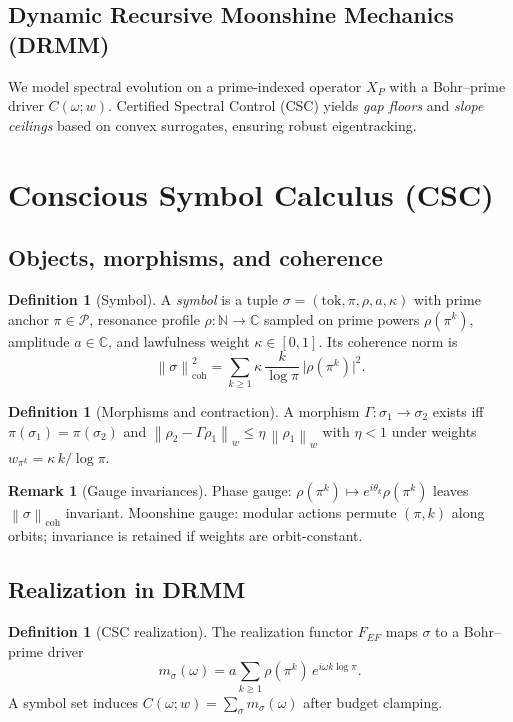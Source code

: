 \documentclass[11pt]{article}
\theoremstyle{plain}
\theoremstyle{definition}
\newtheorem{definition}[theorem]{Definition}
\newtheorem{remark}[theorem]{Remark}
\newcommand{\N}{\mathbb{N}}
\newcommand{\C}{\mathbb{C}}
\newcommand{\PP}{\mathcal{P}}
\newcommand{\norm}[1]{\left\lVert #1 \right\rVert}
\begin{document}
\subsection{Dynamic Recursive Moonshine Mechanics (DRMM)}
We model spectral evolution on a prime-indexed operator \(X_P\) with a Bohr--prime driver \(C(\omega;w)\). Certified Spectral Control (CSC) yields \emph{gap floors} and \emph{slope ceilings} based on convex surrogates, ensuring robust eigentracking.

\section{Conscious Symbol Calculus (CSC)}\label{sec:CSC}
\subsection{Objects, morphisms, and coherence}
\begin{definition}[Symbol]\label{def:symbol}
A \emph{symbol} is a tuple \(\sigma=(\mathrm{tok}, \pi, \rho, a, \kappa)\) with prime anchor \(\pi\in\PP\), resonance profile \(\rho:\N\to\C\) sampled on prime powers \(\rho(\pi^k)\), amplitude \(a\in\C\), and lawfulness weight \(\kappa\in[0,1]\). Its coherence norm is
\begin{equation}
\norm{\sigma}_{\mathrm{coh}}^2
= \sum_{k\ge 1} \kappa\,\frac{k}{\log \pi}\,\big|\rho(\pi^k)\big|^2.
\end{equation}
\end{definition}

\begin{definition}[Morphisms and contraction]
A morphism \(\Gamma: \sigma_1\to\sigma_2\) exists iff \(\pi(\sigma_1)=\pi(\sigma_2)\) and
\(\norm{\rho_2 - \Gamma\rho_1}_w \le \eta\,\norm{\rho_1}_w\) with \(\eta<1\) under weights \(w_{\pi^k}=\kappa\,k/\log\pi\).
\end{definition}

\begin{remark}[Gauge invariances]
Phase gauge: \(\rho(\pi^k)\mapsto e^{i\theta_{k}}\rho(\pi^k)\) leaves \(\norm{\sigma}_{\mathrm{coh}}\) invariant. Moonshine gauge: modular actions permute \((\pi,k)\) along orbits; invariance is retained if weights are orbit-constant.
\end{remark}

\subsection{Realization in DRMM}
\begin{definition}[CSC realization]
The realization functor \(F_{EF}\) maps \(\sigma\) to a Bohr--prime driver
\begin{equation}
 m_{\sigma}(\omega)= a\sum_{k\ge 1} \rho(\pi^k)\,e^{i\omega k \log \pi}.
\end{equation}
A symbol set induces \(C(\omega;w)=\sum_{\sigma} m_{\sigma}(\omega)\) after budget clamping.
\end{definition}
\end{document}

